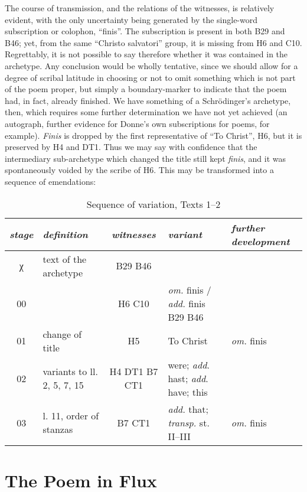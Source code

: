 \begin{paper}
\noindent The course of transmission, and the relations of the witnesses, is
relatively evident, with the only uncertainty being generated by the
single-word subscription or colophon, ``finis''. The subscription is
present in both B29 and B46; yet, from the same ``Christo salvatori''
group, it is missing from H6 and C10. Regrettably, it is not possible to
say therefore whether it was contained in the archetype. Any conclusion
would be wholly tentative, since we should allow for a degree of scribal
latitude in choosing or not to omit something which is not part of the
poem proper, but simply a boundary-marker to indicate that the poem had,
in fact, already finished. We have something of a Schrödinger's
archetype, then, which requires some further determination we have not
yet achieved (an autograph, further evidence for Donne's own
subscriptions for poems, for example). \emph{Finis} is dropped by the
first representative of ``To Christ'', H6, but it is preserved by H4 and
DT1. Thus we may say with confidence that the intermediary sub-archetype
which changed the title still kept \emph{finis}, and it was
spontaneously voided by the scribe of H6. This may be transformed into a sequence of emendations:

\begin{table}[H]
    \centering\scriptsize\renewcommand{\arraystretch}{1.5}
    \caption{Sequence of variation, Texts 1--2}
    \label{tab:lappin:2}
    \begin{tabular}{c|p{}|c|p{}|p{}}
    \toprule
    \emph{stage} & \emph{definition} & \emph{witnesses} & \emph{variant} &
    \emph{further development} \\
    \midrule
    χ & text of the archetype & B29 B46 & & \tabularnewline
    \hline 00 & & H6 C10 & \emph{om.} finis / \emph{add.} finis B29 B46
    &\tabularnewline
    \hline 01 & change of title & H5 & To Christ & \emph{om.} finis\tabularnewline
    \hline 02 & variants to ll. 2, 5, 7, 15 & H4 DT1 B7 CT1 & were; \emph{add}.
    hast; \emph{add}. have; this &\tabularnewline
    \hline 03 & l. 11, order of stanzas & B7 CT1 & \emph{add.} that; \emph{transp.}
    st. II--III & \emph{om.} finis\\
    \bottomrule
    \end{tabular}
\end{table}

\section{The Poem in Flux}


\end{paper}
